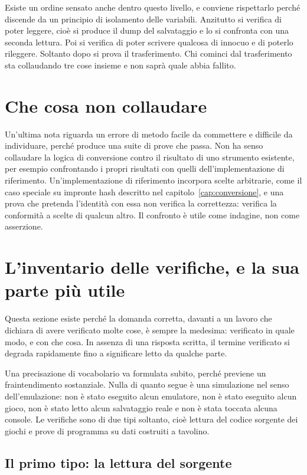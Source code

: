 Esiste un ordine sensato anche dentro questo livello, e conviene rispettarlo perché discende da un principio di isolamento delle variabili. Anzitutto si verifica di poter leggere, cioè si produce il dump del salvataggio e lo si confronta con una seconda lettura. Poi si verifica di poter scrivere qualcosa di innocuo e di poterlo rileggere. Soltanto dopo si prova il trasferimento. Chi cominci dal trasferimento sta collaudando tre cose insieme e non saprà quale abbia fallito.

\section{Che cosa non collaudare}

Un'ultima nota riguarda un errore di metodo facile da commettere e difficile da individuare, perché produce una suite di prove che passa. Non ha senso collaudare la logica di conversione contro il risultato di uno strumento esistente, per esempio confrontando i propri risultati con quelli dell'implementazione di riferimento. Un'implementazione di riferimento incorpora scelte arbitrarie, come il caso speciale su impronte hash descritto nel capitolo~\ref{cap:conversione}, e una prova che pretenda l'identità con essa non verifica la correttezza: verifica la conformità a scelte di qualcun altro. Il confronto è utile come indagine, non come asserzione.


\section{L'inventario delle verifiche, e la sua parte più utile}

Questa sezione esiste perché la domanda corretta, davanti a un lavoro che dichiara di avere verificato molte cose, è sempre la medesima: verificato in quale modo, e con che cosa. In assenza di una risposta scritta, il termine verificato si degrada rapidamente fino a significare letto da qualche parte.

Una precisazione di vocabolario va formulata subito, perché previene un fraintendimento sostanziale. Nulla di quanto segue è una simulazione nel senso dell'emulazione: non è stato eseguito alcun emulatore, non è stato eseguito alcun gioco, non è stato letto alcun salvataggio reale e non è stata toccata alcuna console. Le verifiche sono di due tipi soltanto, cioè lettura del codice sorgente dei giochi e prove di programma su dati costruiti a tavolino.

\subsection{Il primo tipo: la lettura del sorgente}

